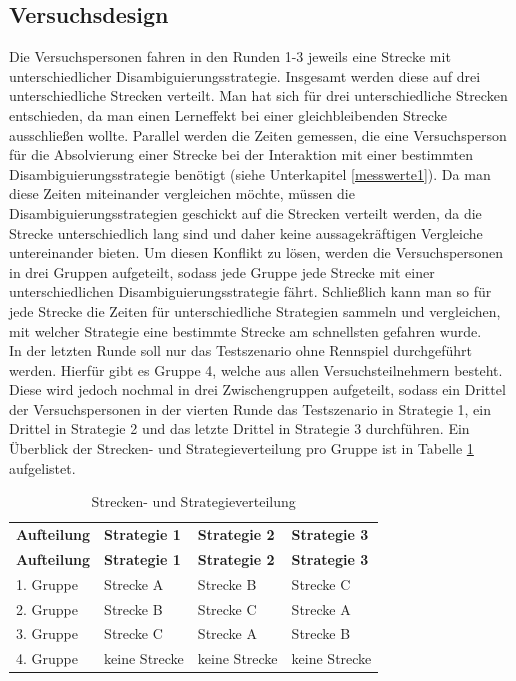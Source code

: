 \documentclass[12pt,a4paper]{scrartcl}
\begin{document}
\subsection{Versuchsdesign}
Die Versuchspersonen fahren in den Runden 1-3 jeweils eine Strecke mit unterschiedlicher Disambiguierungsstrategie. Insgesamt werden diese auf drei unterschiedliche Strecken verteilt. Man hat sich für drei unterschiedliche Strecken entschieden, da man einen Lerneffekt bei einer gleichbleibenden Strecke ausschließen wollte. Parallel  werden die Zeiten gemessen, die eine Versuchsperson für die Absolvierung einer Strecke bei der Interaktion mit einer bestimmten Disambiguierungsstrategie benötigt (siehe Unterkapitel \ref{messwerte1}). Da man diese Zeiten miteinander vergleichen möchte, müssen die Disambiguierungsstrategien geschickt auf die Strecken verteilt werden, da die Strecke unterschiedlich lang sind und daher keine aussagekräftigen Vergleiche untereinander bieten. Um diesen Konflikt zu lösen, werden die Versuchspersonen in drei Gruppen aufgeteilt, sodass jede Gruppe jede Strecke mit einer unterschiedlichen Disambiguierungsstrategie fährt. Schließlich kann man so für jede Strecke die Zeiten für unterschiedliche Strategien sammeln und vergleichen, mit welcher Strategie eine bestimmte Strecke am schnellsten gefahren wurde. \\
In der letzten Runde soll nur das Testszenario ohne Rennspiel durchgeführt werden. Hierfür gibt es Gruppe 4, welche aus allen Versuchsteilnehmern besteht. Diese wird jedoch nochmal in drei Zwischengruppen aufgeteilt, sodass ein Drittel der Versuchspersonen in der vierten Runde das Testszenario in Strategie 1, ein Drittel in Strategie 2 und das letzte Drittel in Strategie 3 durchführen. Ein Überblick der Strecken- und Strategieverteilung pro Gruppe ist in Tabelle \ref{verteilung1} aufgelistet. 

\begin{longtable}{p{3cm}p{3cm}p{3cm}p{3cm} }
	\label{verteilung1}\\
	\caption[Strecken- und Strategieverteilung]{Strecken- und Strategieverteilung}\\
	\hline
	\textbf{Aufteilung}&\textbf{Strategie 1}&\textbf{Strategie 2} &\textbf{Strategie 3}\\
	\hline
	\endfirsthead
	\hline
	\textbf{Aufteilung}&\textbf{Strategie 1}&\textbf{Strategie 2} &\textbf{Strategie 3}\\
	\hline
	\endhead
1. Gruppe & Strecke A & Strecke B & Strecke C \\
2. Gruppe & Strecke B & Strecke C & Strecke A \\
3. Gruppe  & Strecke C & Strecke A & Strecke B \\
4. Gruppe   & keine Strecke & keine Strecke & keine Strecke\\ 
\hline
\end{longtable}
\end{document}
